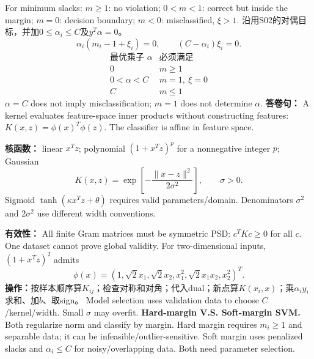 For minimum slacks: $m\ge1$: no violation; $0<m<1$: correct but inside the margin; $m=0$: decision boundary; $m<0$: misclassified, $\xi>1$.
沿用S02的对偶目标，并加$0\le\alpha_i\le C$及$y^T\alpha=0$。
\[\alpha_i(m_i-1+\xi_i)=0,\qquad(C-\alpha_i)\xi_i=0.\]
\[\begin{array}{c|l}
\text{最优乘子 }\alpha&\text{必须满足}\\
0&m\ge1\\
0<\alpha<C&m=1,\ \xi=0\\
C&m\le1
\end{array}\]
$\alpha=C$ does not imply misclassification; $m=1$ does not determine $\alpha$.
\textbf{答卷句：} A kernel evaluates feature-space inner products without constructing features: $K(x,z)=\phi(x)^T\phi(z)$. The classifier is affine in feature space.

\textbf{核函数：} linear $x^Tz$; polynomial $(1+x^Tz)^p$ for a nonnegative integer $p$; Gaussian
\[K(x,z)=\exp\!\left[-\frac{\|x-z\|^2}{2\sigma^2}\right],\qquad\sigma>0.\]
Sigmoid $\tanh(\kappa x^Tz+\theta)$ requires valid parameters/domain. Denominators $\sigma^2$ and $2\sigma^2$ use different width conventions.

\textbf{有效性：} All finite Gram matrices must be symmetric PSD: $c^TKc\ge0$ for all $c$. One dataset cannot prove global validity.
For two-dimensional inputs, $(1+x^Tz)^2$ admits
\[\phi(x)=(1,\sqrt2x_1,\sqrt2x_2,x_1^2,
\sqrt2x_1x_2,x_2^2)^T.\]
\textbf{操作：}按样本顺序算$K_{ij}$；检查对称和对角；代入dual；新点算$K(x_i,x)$；乘$\alpha_i y_i$求和、加$b$、取sign。
Model selection uses validation data to choose $C$/kernel/width. Small $\sigma$ may overfit.
\textbf{Hard-margin V.S. Soft-margin SVM.} Both regularize norm and classify by margin. Hard margin requires $m_i\ge1$ and separable data; it can be infeasible/outlier-sensitive. Soft margin uses penalized slacks and $\alpha_i\le C$ for noisy/overlapping data. Both need parameter selection.

